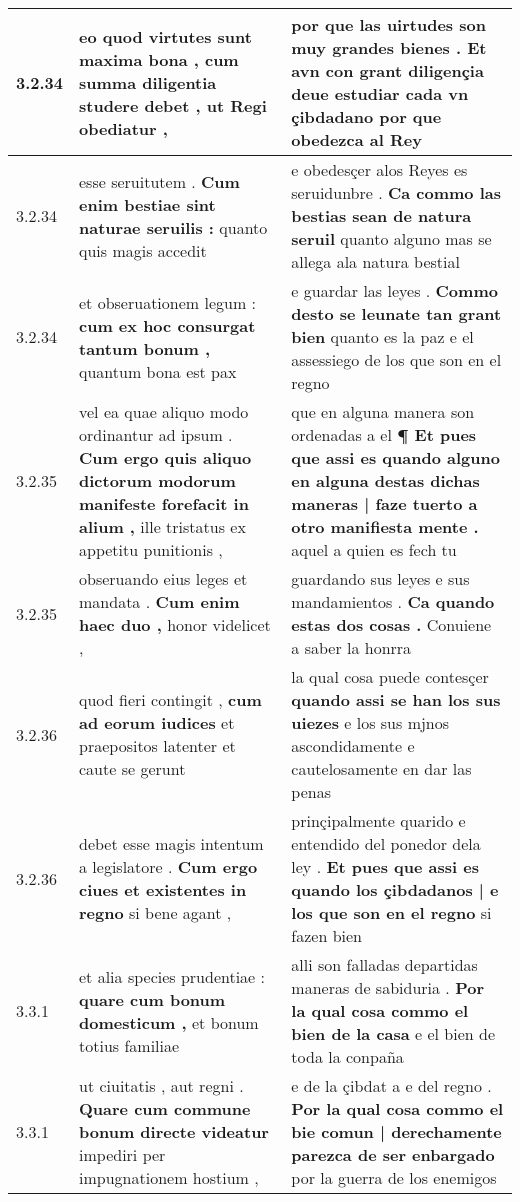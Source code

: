 \begin{tabular}{|p{1cm}|p{6.5cm}|p{6.5cm}|}
3.2.34 & eo quod virtutes sunt maxima bona , \textbf{ cum summa diligentia studere debet , } ut Regi obediatur , & por que las uirtudes son muy grandes bienes . \textbf{ Et avn con grant diligençia deue estudiar cada vn çibdadano } por que obedezca al Rey \\\hline
3.2.34 & esse seruitutem . \textbf{ Cum enim bestiae sint naturae seruilis : } quanto quis magis accedit & e obedesçer alos Reyes es seruidunbre . \textbf{ Ca commo las bestias sean de natura seruil } quanto alguno mas se allega ala natura bestial \\\hline
3.2.34 & et obseruationem legum : \textbf{ cum ex hoc consurgat tantum bonum , } quantum bona est pax & e guardar las leyes . \textbf{ Commo desto se leunate tan grant bien } quanto es la paz e el assessiego de los que son en el regno \\\hline
3.2.35 & vel ea quae aliquo modo ordinantur ad ipsum . \textbf{ Cum ergo quis aliquo dictorum modorum manifeste forefacit in alium , } ille tristatus ex appetitu punitionis , & que en alguna manera son ordenadas a el \textbf{ ¶ Et pues que assi es quando alguno en alguna destas dichas maneras | faze tuerto a otro manifiesta mente . } aquel a quien es fech tu \\\hline
3.2.35 & obseruando eius leges et mandata . \textbf{ Cum enim haec duo , } honor videlicet , & guardando sus leyes e sus mandamientos . \textbf{ Ca quando estas dos cosas . } Conuiene a saber la honrra \\\hline
3.2.36 & quod fieri contingit , \textbf{ cum ad eorum iudices } et praepositos latenter et caute se gerunt & la qual cosa puede contesçer \textbf{ quando assi se han los sus uiezes } e los sus mjnos ascondidamente e cautelosamente en dar las penas \\\hline
3.2.36 & debet esse magis intentum a legislatore . \textbf{ Cum ergo ciues et existentes in regno } si bene agant , & prinçipalmente quarido e entendido del ponedor dela ley . \textbf{ Et pues que assi es quando los çibdadanos | e los que son en el regno } si fazen bien \\\hline
3.3.1 & et alia species prudentiae : \textbf{ quare cum bonum domesticum , } et bonum totius familiae & alli son falladas departidas maneras de sabiduria . \textbf{ Por la qual cosa commo el bien de la casa } e el bien de toda la conpaña \\\hline
3.3.1 & ut ciuitatis , aut regni . \textbf{ Quare cum commune bonum directe videatur } impediri per impugnationem hostium , & e de la çibdat a e del regno . \textbf{ Por la qual cosa commo el bie comun | derechamente parezca de ser enbargado } por la guerra de los enemigos \\\hline

\end{tabular}
